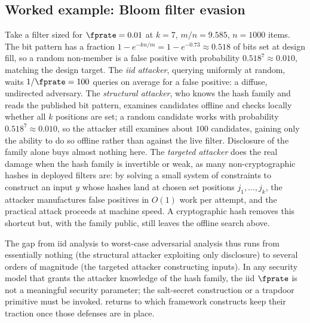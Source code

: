 \subsection*{Worked example: Bloom filter evasion}

Take a filter sized for $\fprate = 0.01$ at $k = 7$, $m/n = 9.585$, $n =
1000$ items. The bit pattern has a fraction $1 - e^{-kn/m} = 1 - e^{-0.73}
\approx 0.518$ of bits set at design fill, so a random non-member is a
false positive with probability $0.518^7 \approx 0.010$, matching the
design target. The \emph{iid attacker}, querying uniformly at random,
waits $1/\fprate = 100$ queries on average for a false positive: a
diffuse, undirected adversary. The \emph{structural attacker}, who knows
the hash family and reads the published bit pattern, examines candidates
offline and checks locally whether all $k$ positions are set; a random
candidate works with probability $0.518^7 \approx 0.010$, so the attacker
still examines about $100$ candidates, gaining only the ability to do so
offline rather than against the live filter. Disclosure of the family
alone buys almost nothing here. The \emph{targeted attacker} does the
real damage when the hash family is invertible or weak, as many
non-cryptographic hashes in deployed filters are: by solving a small
system of constraints to construct an input $y$ whose hashes land at
chosen set positions $j_1, \ldots, j_k$, the attacker manufactures false
positives in $O(1)$ work per attempt, and the practical attack proceeds at
machine speed. A cryptographic hash removes this shortcut but, with the
family public, still leaves the offline search above.

The gap from iid analysis to worst-case adversarial analysis thus runs
from essentially nothing (the structural attacker exploiting only
disclosure) to several orders of magnitude (the targeted attacker
constructing inputs). In any security model that grants the attacker
knowledge of the hash family, the iid $\fprate$ is not a meaningful
security parameter; the salt-secret construction or a trapdoor primitive
must be invoked.  returns to which
framework constructs keep their traction once those defenses are in
place.
